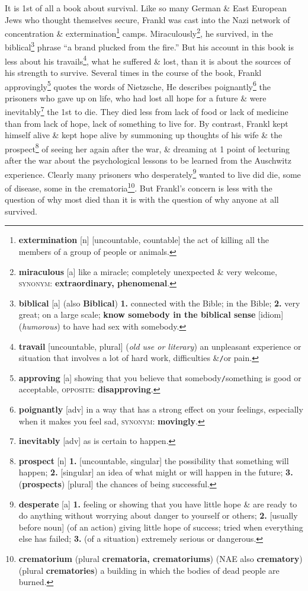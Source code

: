 \documentclass[oneside]{book}
\numberwithin{equation}{section}
\begin{document}
It is 1st of all a book about survival. Like so many German \& East European Jews who thought themselves secure, Frankl was cast into the Nazi network of concentration \& extermination\footnote{\textbf{extermination} [n] [uncountable, countable] the act of killing all the members of a group of people or animals.} camps. Miraculously\footnote{\textbf{miraculous} [a] like a miracle; completely unexpected \& very welcome, \textsc{synonym}: \textbf{extraordinary, phenomenal}.}, he survived, in the biblical\footnote{\textbf{biblical} [a] (also \textbf{Biblical}) \textbf{1.} connected with the Bible; in the Bible; \textbf{2.} very great; on a large scale; \textbf{know somebody in the biblical sense} [idiom] (\textit{humorous}) to have had sex with somebody.} phrase ``a brand plucked from the fire.'' But his account in this book is less about his travails\footnote{\textbf{travail} [uncountable, plural] (\textit{old use or literary}) an unpleasant experience or situation that involves a lot of hard work, difficulties \&\texttt{/}or pain.}, what he suffered \& lost, than it is about the sources of his strength to survive. Several times in the course of the book, Frankl approvingly\footnote{\textbf{approving} [a] showing that you believe that somebody\texttt{/}something is good or acceptable, \textsc{opposite}: \textbf{disapproving}.} quotes the words of Nietzsche,  He describes poignantly\footnote{\textbf{poignantly} [adv] in a way that has a strong effect on your feelings, especially when it makes you feel sad, \textsc{synonym}: \textbf{movingly}.} the prisoners who gave up on life, who had lost all hope for a future \& were inevitably\footnote{\textbf{inevitably} [adv] as is certain to happen.} the 1st to die. They died less from lack of food or lack of medicine than from lack of hope, lack of something to live for. By contrast, Frankl kept himself alive \& kept hope alive by summoning up thoughts of his wife \& the prospect\footnote{\textbf{prospect} [n] \textbf{1.} [uncountable, singular] the possibility that something will happen; \textbf{2.} [singular] an idea of what might or will happen in the future; \textbf{3.} (\textbf{prospects}) [plural] the chances of being successful.} of seeing her again after the war, \& dreaming at 1 point of lecturing after the war about the psychological lessons to be learned from the Auschwitz experience. Clearly many prisoners who desperately\footnote{\textbf{desperate} [a] \textbf{1.} feeling or showing that you have little hope \& are ready to do anything without worrying about danger to yourself or others; \textbf{2.} [usually before noun] (of an action) giving little hope of success; tried when everything else has failed; \textbf{3.} (of a situation) extremely serious or dangerous.} wanted to live did die, some of disease, some in the crematoria\footnote{\textbf{crematorium} (plural \textbf{crematoria, crematoriums}) (NAE also \textbf{crematory}) (plural \textbf{crematories}) a building in which the bodies of dead people are burned.}. But Frankl's concern is less with the question of why most died than it is with the question of why anyone at all survived.
\end{document}
